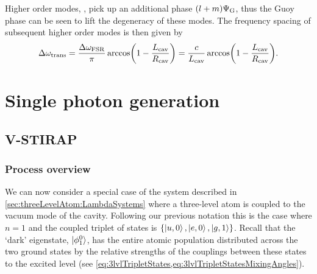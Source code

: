 \documentclass[../Thesis-IJspeert.tex]{subfiles}
\begin{document}
Higher order modes, , pick up an additional phase $(l+m)\Psi_{\mathrm{G}}$, thus the Guoy phase can be seen to lift the degeneracy of these modes.  The frequency spacing of subsequent higher order modes is then given by \cite{dong14}
\begin{equation}
	\Delta\omega\sub{trans} = \frac{\Delta\omega\sub{FSR}}{\pi}\arccos\left(1-\frac{L\sub{cav}}{R\sub{cav}}\right) = \frac{c}{L\sub{cav}}\arccos\left( 1-\frac{L\sub{cav}}{R\sub{cav}} \right).
	\label{eq:transModeSpacing}	
\end{equation}




\section{Single photon generation}
\label{sec:SinglePhotonGeneration}

\subsection{V-STIRAP}
\label{sec:V-STIRAP}

\subsubsection{Process overview}

We can now consider a special case of the system described in \cref{sec:threeLevelAtom:LambdaSystems} where a three-level atom is coupled to the vacuum mode of the cavity.  Following our previous notation this is the case where $n=1$ and the coupled triplet of states is $\{\ket{u,0},\ket{e,0},\ket{g,1}\}$.  Recall that the `dark' eigenstate, $\ket{\phi^0_1}$, has the entire atomic population distributed across the two ground states by the relative strengths of the couplings between these states to the excited level (see \cref{eq:3lvlTripletStates,eq:3lvlTripletStatesMixingAngles}).
\end{document}
